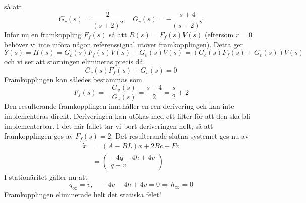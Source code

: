 \documentclass[12pt]{article}
\begin{document}
så att 
\[G_c(s) = \frac{2}{(s+2)^2},\;\;\; G_v(s) = -\frac{s+4}{(s+2)^2}\]
Inför nu en framkoppling $F_f(s)$ så att $R(s) = F_f(s)V(s)$ (eftersom $r = 0$ behöver vi inte införa någon referenssignal utöver framkopplingen). Detta ger 
\[Y(s) = H(s) = G_c(s)F_f(s)V(s)+G_v(s)V(s) = (G_c(s)F_f(s)+G_v(s))V(s)\]
och vi ser att störningen elimineras precis då 
\[G_c(s)F_f(s)+G_v(s) = 0\]
Framkopplingen kan således bestämmas som 
\[F_f(s) = -\frac{G_v(s)}{G_c(s)} = \frac{s+4}{2} = \frac{s}{2} + 2\]
Den resulterande framkopplingen innehåller en ren derivering och kan inte implementeras direkt. Deriveringen kan utökas med ett filter för att den ska bli implementerbar. I det här fallet tar vi bort deriveringen helt, så att framkopplingen ges av $F_f(s) = 2$. Det resulterande slutna systemet ges nu av
\begin{align*}
  \dot{x} &= (A-BL)x+2Bc+Fv \\
          &= \begin{pmatrix}
-4q-4h+4v \\
q-v
          \end{pmatrix}
\end{align*}
I stationäritet gäller nu att 
\[q_{\infty} = v,\;\;\; -4v-4h+4v=0 \Rightarrow h_{\infty} = 0\]
Framkopplingen eliminerade helt det statiska felet!
\end{document}
